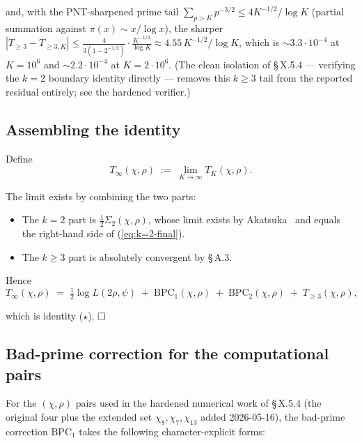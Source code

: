 and, with the PNT-sharpened prime tail
\(\sum_{p>K}p^{-3/2}\le 4K^{-1/2}/\log K\) (partial summation against
\(\pi(x)\sim x/\log x\)), the sharper
\(|T_{\ge 3}-T_{\ge 3,K}|\le \frac{4}{3(1-2^{-1/2})}\cdot
\frac{K^{-1/2}}{\log K}\approx 4.55\,K^{-1/2}/\log K\), which is
\(\sim 3.3\cdot 10^{-4}\) at \(K = 10^6\) and \(\sim 2.2\cdot 10^{-4}\)
at \(K = 2 \cdot 10^6\). (The clean isolation of \S\,X.5.4 --- verifying
the \(k=2\) boundary identity directly --- removes this \(k\ge3\) tail
from the reported residual entirely; see the hardened verifier.)

\subsection{Assembling the identity}

Define
\[
T_\infty(\chi,\rho) \;:=\; \lim_{K \to \infty} T_K(\chi,\rho).
\]

The limit exists by combining the two parts:

\begin{itemize}
\item
  The \(k = 2\) part is \(\tfrac12 \Sigma_2(\chi, \rho)\), whose limit
  exists by Akatsuka~\cite[Lemma~2.1 \& eq.~(2.5)]{Akatsuka2017EulerProduct} and equals the
  right-hand side of (\ref{eq:k=2-final}).
\item
  The \(k \ge 3\) part is absolutely convergent by \S\,A.3.
\end{itemize}

Hence
\[
T_\infty(\chi, \rho)
\;=\;
\tfrac12 \log L(2\rho, \psi)
\;+\; \mathrm{BPC}_1(\chi, \rho)
\;+\; \mathrm{BPC}_2(\chi, \rho)
\;+\; T_{\ge 3}(\chi, \rho),
\]

which is identity (\(\star\)). \(\hfill\square\)

\subsection{Bad-prime correction for the computational pairs}

For the \((\chi, \rho)\) pairs used in the hardened numerical work of
\S\,X.5.4 (the original four plus the extended set \(\chi_8, \chi_7,
\chi_{13}\) added 2026-05-16), the bad-prime correction
\(\mathrm{BPC}_1\) takes the following character-explicit forms:

